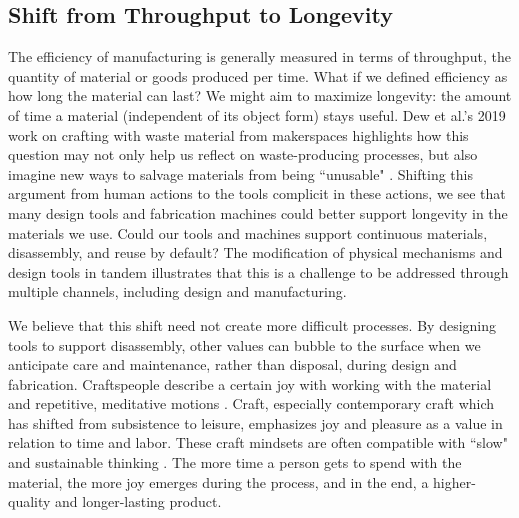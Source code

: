 
\subsection{Shift from Throughput to Longevity}

The efficiency of manufacturing is generally measured in terms of throughput, the quantity of material or goods produced per time. What if we defined efficiency as how long the material can last? We might aim to maximize longevity: the amount of time a material (independent of its object form) stays useful. Dew et al.'s 2019 work on crafting with waste material from makerspaces highlights how this question may not only help us reflect on waste-producing processes, but also imagine new ways to salvage materials from being ``unusable" \cite{Dew:2019:DWS:3322276.3322320}. Shifting this argument from human actions to the tools complicit in these actions, we see that many design tools and fabrication machines could better support longevity in the materials we use. Could our tools and machines support continuous materials, disassembly, and reuse by default? The modification of physical mechanisms and design tools in tandem illustrates that this is a challenge to be addressed through multiple channels, including design and manufacturing. 

We believe that this shift need not create more difficult processes. By designing tools to support disassembly, other values can bubble to the surface when we anticipate care and maintenance, rather than disposal, during design and fabrication. Craftspeople describe a certain joy with working with the material and repetitive, meditative motions \cite{pye_nature_2007, fletcher_craft_2016, nitsche_when_2019}. Craft, especially contemporary craft which has shifted from subsistence to leisure, emphasizes joy and pleasure as a value in relation to time and labor. These craft mindsets are often compatible with ``slow" and sustainable thinking \cite{pan_fashion_2014, phelan_what_2017}. The more time a person gets to spend with the material, the more joy emerges during the process, and in the end, a higher-quality and longer-lasting product.

